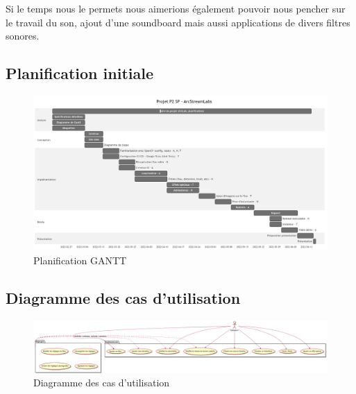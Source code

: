 Si le temps nous le permets nous aimerions également pouvoir nous pencher sur le travail du son, ajout d'une soundboard mais aussi applications de divers filtres sonores.

\newpage

\begin{landscape}

\section{Planification initiale}

\begin{figure}[h]
  \centering
  \includegraphics[width=\textwidth]{./images/gantt.PNG}
  \caption{Planification GANTT}
  \label{gantt}
\end{figure}

\end{landscape}

\newpage

\begin{landscape}

\section{Diagramme des cas d'utilisation}

\begin{figure}[h]
  \centering
  \includegraphics[width=\textheight]{./images/useCase.png}
  \caption{Diagramme des cas d'utilisation}
  \label{useCase}
\end{figure}

\end{landscape}

